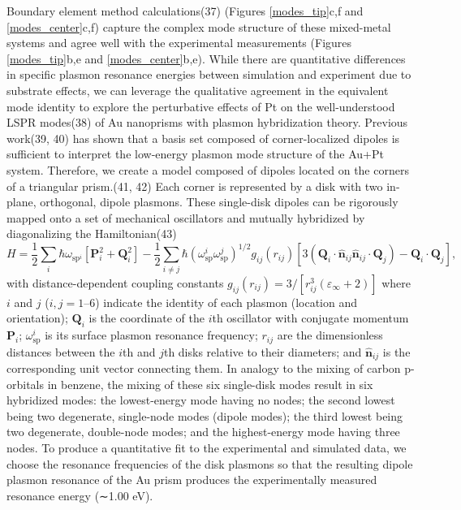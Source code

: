 \documentclass [11pt, proquest] {uwthesis}[2016/11/22]
\begin{document}
Boundary element method calculations(37) (Figures \ref{modes_tip}c,f and \ref{modes_center}c,f) capture the complex mode structure of these mixed-metal systems and agree well with the experimental measurements (Figures \ref{modes_tip}b,e and \ref{modes_center}b,e). While there are quantitative differences in specific plasmon resonance energies between simulation and experiment due to substrate effects, we can leverage the qualitative agreement in the equivalent mode identity to explore the perturbative effects of Pt on the well-understood LSPR modes(38) of Au nanoprisms with plasmon hybridization theory. Previous work(39, 40) has shown that a basis set composed of corner-localized dipoles is sufficient to interpret the low-energy plasmon mode structure of the Au+Pt system. Therefore, we create a model composed of dipoles located on the corners of a triangular prism.(41, 42) Each corner is represented by a disk with two in-plane, orthogonal, dipole plasmons. These single-disk dipoles can be rigorously mapped onto a set of mechanical oscillators and mutually hybridized by diagonalizing the Hamiltonian(43)
\begin{equation}
H = \frac{1}{2}\sum_{i}\hbar\omega_{\textrm{sp}^i}[\textbf{P}_i^2 + \textbf{Q}_i^2] - \frac{1}{2}\sum_{i \neq j}\hbar(\omega_{\textrm{sp}}^i\omega_{\textrm{sp}}^j)^{1/2}g_{ij}(r_{ij})[3(\textbf{Q}_i\cdot\hat{\textbf{n}}_{ij}\hat{\textbf{n}}_{ij}\cdot\textbf{Q}_j)-\textbf{Q}_i\cdot\textbf{Q}_j],
\label{prism_hammy}
\end{equation}
with distance-dependent coupling constants $g_{ij}(r_{ij}) = 3/[r_{ij}^3(\varepsilon_{\infty} + 2)]$ where $i$ and $j$ ($i, j = 1–6$) indicate the identity of each plasmon (location and orientation); $\textbf{Q}_i$ is the coordinate of the $i$th oscillator with conjugate momentum $\textbf{P}_i$; $\omega_{\textrm{sp}}^i$ is its surface plasmon resonance frequency; $r_{ij}$ are the dimensionless distances between the $i$th and $j$th disks relative to their diameters; and $\hat{\textbf{n}}_{ij}$ is the corresponding unit vector connecting them.
In analogy to the mixing of carbon p-orbitals in benzene, the mixing of these six single-disk modes result in six hybridized modes: the lowest-energy mode having no nodes; the second lowest being two degenerate, single-node modes (dipole modes); the third lowest being two degenerate, double-node modes; and the highest-energy mode having three nodes. To produce a quantitative fit to the experimental and simulated data, we choose the resonance frequencies of the disk plasmons so that the resulting dipole plasmon resonance of the Au prism produces the experimentally measured resonance energy (∼1.00 eV).
\end{document}
